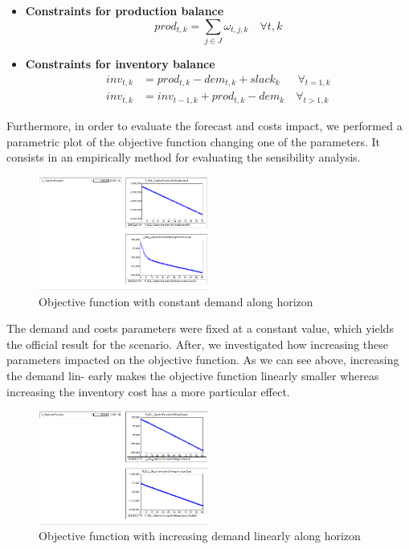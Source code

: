\documentclass[a4paper,12pt]{article}
\begin{document}
\begin{itemize}
    \item \textbf{Constraints for production balance}
        \begin{equation}
            prod_{t, k} = \sum_{j \in J} \omega_{t, j, k} 
            \quad \forall{t, k}
        \end{equation}    
    \item \textbf{Constraints for inventory balance}
        \begin{align}
            inv_{t, k} &= prod_{t, k} - dem_{t, k} + slack_k 
            \quad \;\; \forall_{t=1, k} \\
            inv_{t, k} &= inv_{t-1, k} + prod_{t, k} - dem_k
            \quad \forall_{t>1, k}
        \end{align}
\end{itemize}

Furthermore, in order to evaluate the forecast and costs impact, 
we performed a parametric plot of the objective function changing one of the parameters. It consists in an empirically method for evaluating the sensibility analysis. 

\begin{figure}[H]
\centering
\includegraphics[width=0.5\textwidth]{3.png}
\caption{Objective function with constant demand along horizon}
\end{figure}

The demand and costs parameters were fixed at a constant value, which yields the official result for the scenario. After, we investigated how increasing these parameters impacted on the objective function. As we can see above, increasing the demand lin- early makes the objective function linearly smaller whereas increasing the inventory cost has a more particular effect.

\begin{figure}[H]
\centering
\includegraphics[width=0.5\textwidth]{4.png}
\caption{Objective function with increasing demand linearly along horizon}
\end{figure} 
\end{document}
